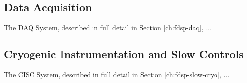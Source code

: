 \subsection{Data Acquisition}
\label{sec:fdsp-ov-daq}

The DAQ System, described in full detail in Section \ref{ch:fdsp-daq}, ...
\subsection{Cryogenic Instrumentation and Slow Controls}
\label{sec:fdsp-ov-instr}

The CISC System, described in full detail in Section \ref{ch:fdsp-slow-cryo}, ...





